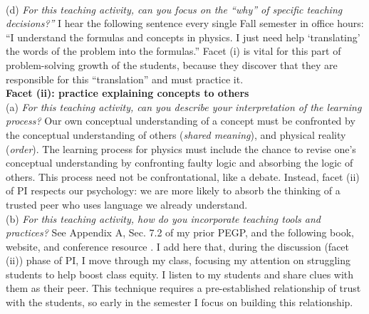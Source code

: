 \documentclass[../../../main.tex]{subfiles}
\begin{document}
\\
\vspace{0.25cm}
(d) \textit{For this teaching activity, can you focus on the ``why'' of specific teaching decisions?''}  I hear the following sentence every single Fall semester in office hours: ``I understand the formulas and concepts in physics.  I just need help `translating' the words of the problem into the formulas.''  Facet (i) is vital for this part of problem-solving growth of the students, because they discover that they are responsible for this ``translation'' and must practice it.
\\
\vspace{0.25cm}
\textbf{Facet (ii): practice explaining concepts to others} 
\\
\vspace{0.25cm}
(a) \textit{For this teaching activity, can you describe your interpretation of the learning process?} Our own conceptual understanding of a concept must be confronted by the conceptual understanding of others (\textit{shared meaning}), and physical reality (\textit{order}).  The learning process for physics must include the chance to revise one's conceptual understanding by confronting faulty logic and absorbing the logic of others.  This process need not be confrontational, like a debate.  Instead, facet (ii) of PI respects our psychology: we are more likely to absorb the thinking of a trusted peer who uses language we already understand.
\\
\vspace{0.25cm}
(b) \textit{For this teaching activity, how do you incorporate teaching tools and practices?}  See Appendix A, Sec. 7.2 of my prior PEGP, and the following book, website, and conference resource \cite{mazur2013peer,PhysPort,AAPTPI}.  I add here that, during the discussion (facet (ii)) phase of PI, I move through my class, focusing my attention on struggling students to help boost class equity.  I listen to my students and share clues with them as their peer.  This technique requires a pre-established relationship of trust with the students, so early in the semester I focus on building this relationship.
\\
\vspace{0.25cm}
\end{document}
